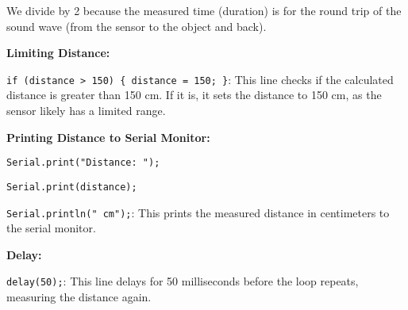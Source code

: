 \documentclass{article}
\begin{document}
We divide by 2 because the measured time (duration) is for the round trip of the sound wave (from the sensor to the object and back).

\textbf{Limiting Distance:}

\texttt{if (distance > 150) \{ distance = 150; \}}: This line checks if the calculated distance is greater than 150 cm. If it is, it sets the distance to 150 cm, as the sensor likely has a limited range.

\textbf{Printing Distance to Serial Monitor:}

\texttt{Serial.print("Distance: ");}

\texttt{Serial.print(distance);}

\texttt{Serial.println(" cm");}: This prints the measured distance in centimeters to the serial monitor.

\textbf{Delay:}

\texttt{delay(50);}: This line delays for 50 milliseconds before the loop repeats, measuring the distance again.
\end{document}
